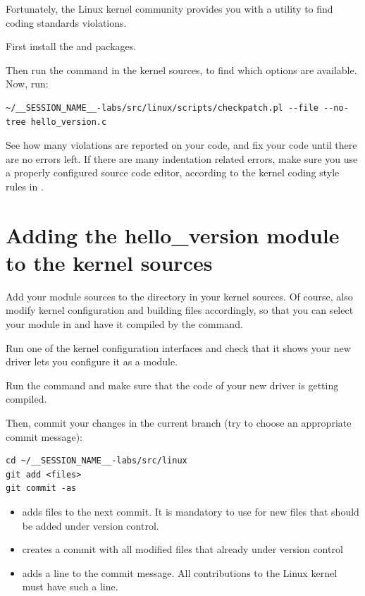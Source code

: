 Fortunately, the Linux kernel community provides you with a utility to
find coding standards violations.

First install the  and  packages.

Then run the  command in the kernel sources,
to find which options are available.  Now, run:

\begin{verbatim}
~/__SESSION_NAME__-labs/src/linux/scripts/checkpatch.pl --file --no-tree hello_version.c
\end{verbatim}

See how many violations are reported on your code, and fix your code
until there are no errors left. If there are many indentation related
errors, make sure you use a properly configured source code editor,
according to the kernel coding style rules in
.

\section{Adding the hello\_version module to the kernel sources}

Add your module sources to the  directory in your
kernel sources. Of course, also modify kernel configuration and
building files accordingly, so that you can select your module in
 and have it compiled by the  command.

Run one of the kernel configuration interfaces and check that it
shows your new driver lets you configure it as a module.

Run the  command and make sure that the code of your new
driver is getting compiled.

Then, commit your changes in the current branch (try to choose an
appropriate commit message):

\begin{verbatim}
cd ~/__SESSION_NAME__-labs/src/linux
git add <files>
git commit -as
\end{verbatim}

\begin{itemize}
\item {} adds files to the next commit. It is mandatory to
  use for new files that should be added under version control.
\item {} creates a commit with all modified files
  that already under version control
\item {} adds a  line to the
      commit message. All contributions to the Linux kernel must have
      such a line.
\end{itemize}

